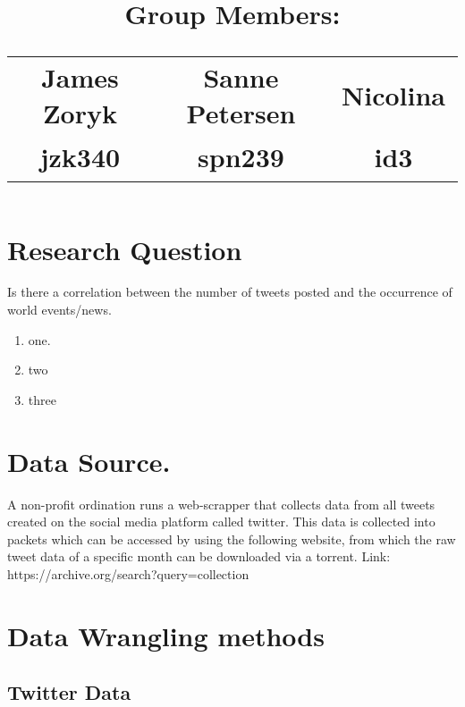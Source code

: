 \documentclass[9pt]{article}
\title{\vspace{-130pt}
\huge \subjectTitle  \\ 
\vspace{10pt} \large \subjectDes 
\\ \vspace{10pt} \large \\ Group Members: \\
\begin{tabular}{c c c}
    James Zoryk & Sanne Petersen & Nicolina \\
    jzk340 & spn239 &id3 
\end{tabular}}
\date{}
\begin{document}
\maketitle{}

\section{Research Question}
Is there a correlation between the number of tweets posted and the occurrence of world
events/news.
\begin{enumerate}
    \item one.
    \item two 
    \item three 
\end{enumerate}
\section{Data Source.}
A non-profit ordination runs a web-scrapper that collects data from all tweets created on
the social media platform called twitter. This data is collected into packets which can be
accessed by using the following website, from which the raw tweet data of a specific month
can be downloaded via a torrent.
Link:  https://archive.org/search?query=collection%


\section{Data Wrangling methods}
\subsection{Twitter Data}
\end{document}
